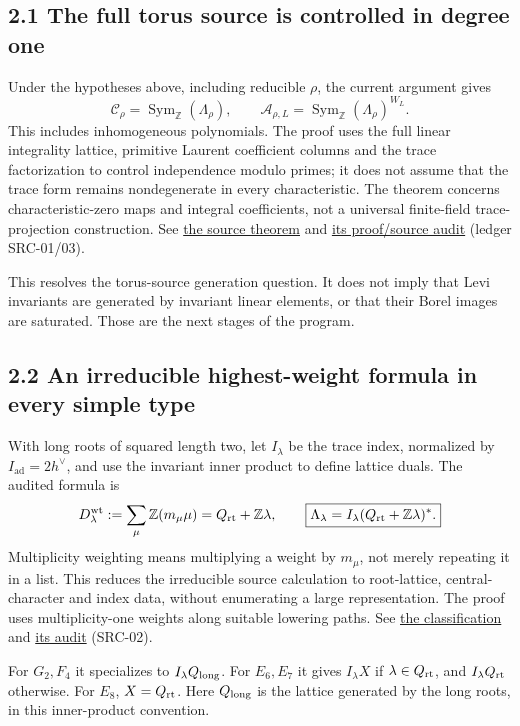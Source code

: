 \documentclass[11pt,letterpaper]{article}
\newcommand{\Z}{\mathbb Z}
\newcommand{\Sym}{\operatorname{Sym}}
\newcommand{\ad}{\mathrm{ad}}
\newcommand{\repo}{https://github.com/sean-rogers-t/Sage-programs/blob/e9fcb7f3b7d28bea9c248abab1f01d8de28250aa/}
\newcommand{\record}[2]{\href{\repo#1}{#2}}
\begin{document}
\subsection*{2.1 The full torus source is controlled in degree one}
Under the hypotheses above, including reducible \(\rho\), the current
argument gives
\[
 \boxed{\mathcal C_\rho=\Sym_\Z(\Lambda_\rho),\qquad
 \mathcal A_{\rho,L}=\Sym_\Z(\Lambda_\rho)^{W_L}.}
\]
This includes inhomogeneous polynomials. The proof uses the full linear
integrality lattice, primitive Laurent coefficient columns and the trace
factorization to control independence modulo primes; it does not assume
that the trace form remains nondegenerate in every characteristic.
The theorem concerns characteristic-zero maps and integral coefficients,
not a universal finite-field trace-projection construction.
See \record{borel/TRACE_SOURCE_THEOREM.md}{the source theorem} and
\record{borel/TRACE_SOURCE_AUDIT.md}{its proof/source audit}
(ledger SRC-01/03).

This resolves the torus-source generation question. It does not imply that
Levi invariants are generated by invariant linear elements, or that their
Borel images are saturated. Those are the next stages of the program.

\subsection*{2.2 An irreducible highest-weight formula in every simple type}
With long roots of squared length two, let \(I_\lambda\) be the trace
index, normalized by \(I_\ad=2h^\vee\), and use the invariant inner product
to define lattice duals. The audited formula is
\[
 D_\lambda^{\rm wt}:=\sum_\mu\Z(m_\mu\mu)
       =Q_{\rm rt}+\Z\lambda,\qquad
 \boxed{\Lambda_\lambda
       =I_\lambda(Q_{\rm rt}+\Z\lambda)^*.}
\]
Multiplicity weighting means multiplying a weight by \(m_\mu\), not merely
repeating it in a list. This reduces the irreducible source calculation to
root-lattice, central-character and index data, without enumerating a large
representation. The proof uses multiplicity-one weights along suitable
lowering paths. See
\record{borel/IRREDUCIBLE_CHARACTER_LATTICES.md}{the classification} and
\record{borel/IRREDUCIBLE_LATTICE_AUDIT.md}{its audit} (SRC-02).

For \(G_2,F_4\) it specializes to \(I_\lambda Q_{\rm long}\).
For \(E_6,E_7\) it gives \(I_\lambda X\) if
\(\lambda\in Q_{\rm rt}\), and \(I_\lambda Q_{\rm rt}\) otherwise.
For \(E_8\), \(X=Q_{\rm rt}\). Here \(Q_{\rm long}\) is the lattice
generated by the long roots, in this inner-product convention.
\end{document}
